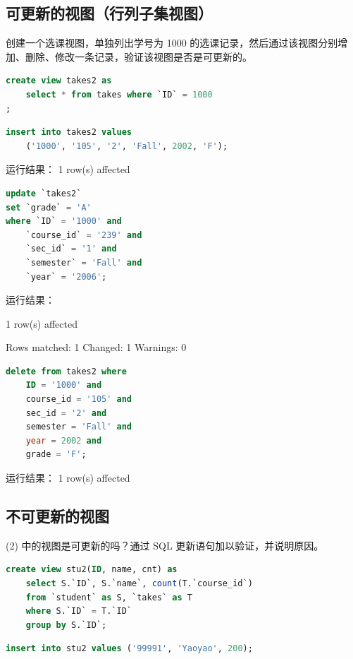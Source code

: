 \documentclass{article}
\begin{document}
\subsection{可更新的视图（行列子集视图）}

创建一个选课视图，单独列出学号为 1000 的选课记录，然后通过该视图分别增加、删除、修改一条记录，验证该视图是否是可更新的。

\begin{lstlisting}[language=sql]
create view takes2 as
	select * from takes where `ID` = 1000
;
\end{lstlisting}


\begin{lstlisting}[language=sql]
insert into takes2 values
	('1000', '105', '2', 'Fall', 2002, 'F');
\end{lstlisting}

运行结果： 1 row(s) affected


\begin{lstlisting}[language=sql]
update `takes2`
set `grade` = 'A'
where `ID` = '1000' and
	`course_id` = '239' and
    `sec_id` = '1' and
    `semester` = 'Fall' and
    `year` = '2006';
\end{lstlisting}

运行结果：

1 row(s) affected

Rows matched: 1  Changed: 1  Warnings: 0

\begin{lstlisting}[language=sql]
delete from takes2 where
	ID = '1000' and
    course_id = '105' and
    sec_id = '2' and
    semester = 'Fall' and
    year = 2002 and
    grade = 'F';
\end{lstlisting}

运行结果： 1 row(s) affected

\subsection{不可更新的视图}

(2) 中的视图是可更新的吗？通过 SQL 更新语句加以验证，并说明原因。

\begin{lstlisting}[language=sql]
create view stu2(ID, name, cnt) as
	select S.`ID`, S.`name`, count(T.`course_id`)
    from `student` as S, `takes` as T
    where S.`ID` = T.`ID`
    group by S.`ID`;
\end{lstlisting}

\begin{lstlisting}[language=sql]
insert into stu2 values ('99991', 'Yaoyao', 200);
\end{lstlisting}
\end{document}
